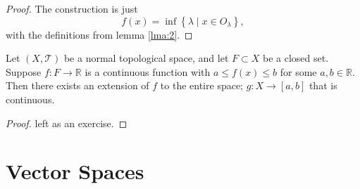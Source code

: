 \documentclass[11pt, letterpaper]{report}
\begin{document}
\begin{proof}
	The construction is just
	\[
		f(x)=\inf \left\{ \lambda \mid x\in O_{\lambda } \right\} 
	,\]
	with the definitions from lemma \ref{lma:2}.
\end{proof}
\begin{theorem}\label{thm:5}
	Let $(X,\mathcal{T} )$ be a normal topological space, and let $F\subset X$ be a closed set. Suppose $f : F \to \mathbb{R}$ is a continuous function with $a\leq f(x)\leq b$ for some $a,b\in\mathbb{R}$. Then there exists an extension of $f$ to the entire space; $g : X \to [a,b]$ that is continuous.
\end{theorem}
\begin{proof}
	left as an exercise.
\end{proof}
\chapter{Vector Spaces}
\end{document}

